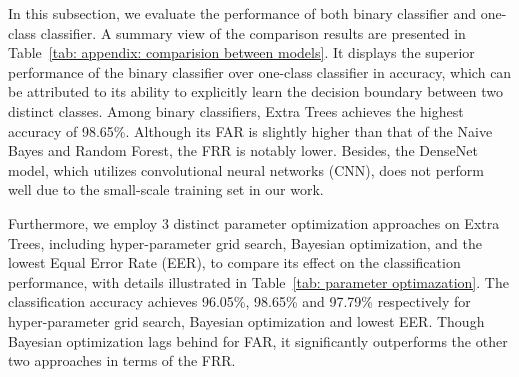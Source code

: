 \documentclass[sigconf]{acmart}
\begin{document}
\begin{table}[t]  
\centering
\caption{Performance comparison between different classification models.}
\label{tab: appendix: comparision between models}
\end{table} 

In this subsection, we evaluate the performance of both binary classifier and one-class classifier. A summary view of the comparison results are presented in Table~\ref{tab: appendix: comparision between models}. It displays the superior performance of the binary classifier over one-class classifier in accuracy, which can be attributed to its ability to explicitly learn the decision boundary between two distinct classes. 
Among binary classifiers, Extra Trees achieves the highest accuracy of 98.65\%. Although its FAR is slightly higher than that of the Naive Bayes and Random Forest, the FRR is notably lower. Besides, the DenseNet model, which utilizes convolutional neural networks (CNN), does not perform well due to the small-scale training set in our work.

Furthermore, we employ $3$ distinct parameter optimization approaches on Extra Trees, including hyper-parameter grid search, Bayesian optimization, and the lowest Equal Error Rate (EER), to compare its effect on the classification performance, with details illustrated in Table~\ref{tab: parameter optimazation}. The classification accuracy achieves 96.05\%, 98.65\% and 97.79\% respectively for hyper-parameter grid search, Bayesian optimization and lowest EER. Though Bayesian optimization lags behind for FAR, it significantly outperforms the other two approaches in terms of the FRR.
\end{document}

